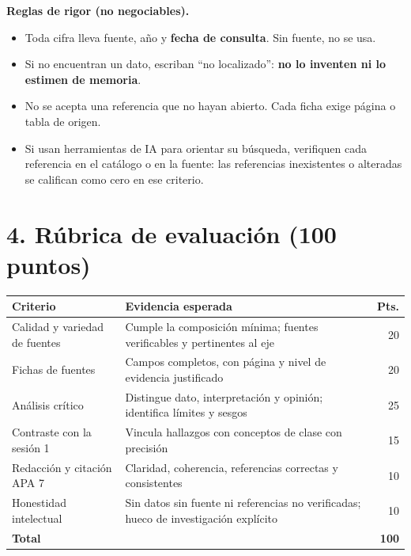 \documentclass[11pt,letterpaper]{article}
\begin{document}
\begin{caja}
\textbf{Reglas de rigor (no negociables).}
\begin{itemize}[leftmargin=1.4em, itemsep=2pt]
  \item Toda cifra lleva fuente, año y \textbf{fecha de consulta}. Sin fuente, no se usa.
  \item Si no encuentran un dato, escriban \enquote{no localizado}: \textbf{no lo inventen ni lo estimen de memoria}.
  \item No se acepta una referencia que no hayan abierto. Cada ficha exige página o tabla de origen.
  \item Si usan herramientas de IA para orientar su búsqueda, verifiquen cada referencia en el catálogo o en la fuente: las referencias inexistentes o alteradas se califican como cero en ese criterio.
\end{itemize}
\end{caja}

\section*{4. Rúbrica de evaluación (100 puntos)}

\begin{center}
\small
\begin{tabular}{@{}>{\raggedright}p{5.2cm}>{\raggedright}p{6.6cm}r@{}}
\toprule
\textbf{Criterio} & \textbf{Evidencia esperada} & \textbf{Pts.} \\
\midrule
Calidad y variedad de fuentes & Cumple la composición mínima; fuentes verificables y pertinentes al eje & 20 \\
Fichas de fuentes & Campos completos, con página y nivel de evidencia justificado & 20 \\
Análisis crítico & Distingue dato, interpretación y opinión; identifica límites y sesgos & 25 \\
Contraste con la sesión 1 & Vincula hallazgos con conceptos de clase con precisión & 15 \\
Redacción y citación APA 7 & Claridad, coherencia, referencias correctas y consistentes & 10 \\
Honestidad intelectual & Sin datos sin fuente ni referencias no verificadas; hueco de investigación explícito & 10 \\
\midrule
\textbf{Total} & & \textbf{100} \\
\bottomrule
\end{tabular}
\end{center}
\end{document}

